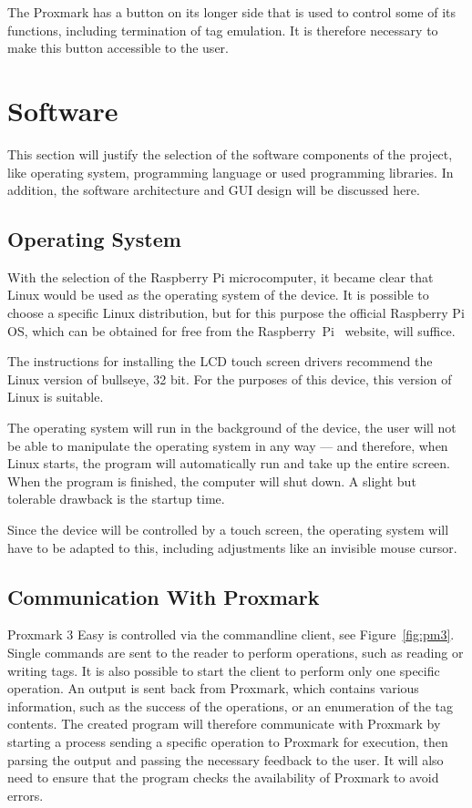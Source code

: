 The Proxmark has a button on its longer side that is used to control some of its functions, including termination of tag emulation. It is therefore necessary to make this button accessible to the user.


\section{Software}

This section will justify the selection of the software components of the project, like operating system, programming language or used programming libraries. In addition, the software architecture and GUI design will be discussed here.

\subsection{Operating System}

With the selection of the Raspberry Pi microcomputer, it became clear that Linux would be used as the operating system of the device. It is possible to choose a specific Linux distribution, but for this purpose the official Raspberry Pi OS, which can be obtained for free from the Raspberry~Pi~\cite{raspberrypios} website, will suffice.

The instructions for installing the LCD touch screen drivers recommend the Linux version of bullseye, 32 bit. For the purposes of this device, this version of Linux is suitable.~\cite{waveshare35inch}

The operating system will run in the background of the device, the user will not be able to manipulate the operating system in any way --- and therefore, when Linux starts, the program will automatically run and take up the entire screen. When the program is finished, the computer will shut down. A slight but tolerable drawback is the startup time.

Since the device will be controlled by a touch screen, the operating system will have to be adapted to this, including adjustments like an invisible mouse cursor.

\subsection{Communication With Proxmark}
\label{subsec:communication}

Proxmark 3 Easy is controlled via the commandline client, see Figure~\ref{fig:pm3}. Single commands are sent to the reader to perform operations, such as reading or writing tags. It is also possible to start the client to perform only one specific operation. An output is sent back from Proxmark, which contains various information, such as the success of the operations, or an enumeration of the tag contents. The created program will therefore communicate with Proxmark by starting a process sending a specific operation to Proxmark for execution, then parsing the output and passing the necessary feedback to the user. It will also need to ensure that the program checks the availability of Proxmark to avoid errors.

